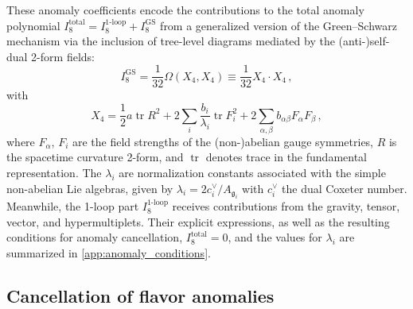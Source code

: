 \documentclass[11pt, a4paper]{article}
\newcommand*{\fkg}{\ensuremath{\mathfrak{g}}}
\DeclareMathOperator{\trace}{tr}
\begin{document}
These anomaly coefficients encode the contributions to the total anomaly polynomial $I_8^\text{total} = I_8^\text{1-loop} + I_8^\text{GS}$ from a generalized version of the Green--Schwarz mechanism \cite{Green:1984bx,Sagnotti:1992qw} via the inclusion of tree-level diagrams mediated by the (anti-)self-dual 2-form fields:
\begin{equation}
    I_8^\text{GS} = \frac{1}{32} \Omega(X_4, X_4) \equiv \frac{1}{32} X_4 \cdot X_4 \,,
\end{equation}
with
\begin{equation}\label{eq:GS-term_general}
    X_4 = \frac12 a \trace R^2 + 2 \sum_i \frac{b_i}{\lambda_i} \trace F_i^2 + 2 \sum_{\alpha,\beta} b_{\alpha \beta} F_\alpha F_\beta \,,
\end{equation}
where $F_\alpha$, $F_i$ are the field strengths of the (non-)abelian gauge symmetries, $R$ is the spacetime curvature 2-form, and $\trace$ denotes trace in the fundamental representation.
The $\lambda_i$ are normalization constants associated with the simple non-abelian Lie algebras, given by $\lambda_i = 2 c_i^\vee / A_{\fkg_i}$ with $c_i^\vee$ the dual Coxeter number.
Meanwhile, the 1-loop part $I_8^\text{1-loop}$ receives contributions from the gravity, tensor, vector, and hypermultiplets.
Their explicit expressions, as well as the resulting conditions for anomaly cancellation, $I_8^\text{total} = 0$, and the values for $\lambda_i$ are summarized in \cref{app:anomaly_conditions}.

\subsection{Cancellation of flavor anomalies}
\label{sec:approach}
\end{document}
